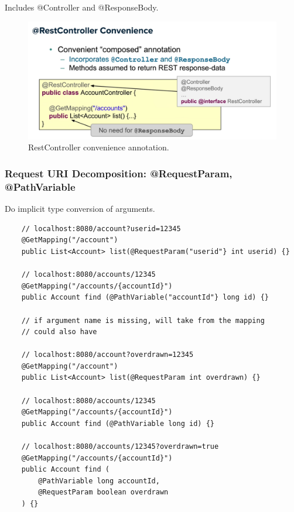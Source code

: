\documentclass{scrartcl}
\begin{document}
Includes @Controller and @ResponseBody.

\begin{figure}
    \centering
    \includegraphics[width=1\linewidth]{restcontroller}
    \caption{RestController convenience annotation.}
    \label{fig:restcontroller}
\end{figure}

\subsubsection{Request URI Decomposition: @RequestParam, @PathVariable}

Do implicit type conversion of arguments.

\begin{lstlisting}
    // localhost:8080/account?userid=12345
    @GetMapping("/account")
    public List<Account> list(@RequestParam("userid"} int userid) {}

    // localhost:8080/accounts/12345
    @GetMapping("/accounts/{accountId}")
    public Account find (@PathVariable("accountId"} long id) {}

    // if argument name is missing, will take from the mapping
    // could also have

    // localhost:8080/account?overdrawn=12345
    @GetMapping("/account")
    public List<Account> list(@RequestParam int overdrawn) {}

    // localhost:8080/accounts/12345
    @GetMapping("/accounts/{accountId}")
    public Account find (@PathVariable long id) {}

    // localhost:8080/accounts/12345?overdrawn=true
    @GetMapping("/accounts/{accountId}")
    public Account find (
        @PathVariable long accountId,
        @RequestParam boolean overdrawn
    ) {}



\end{lstlisting}
\end{document}
